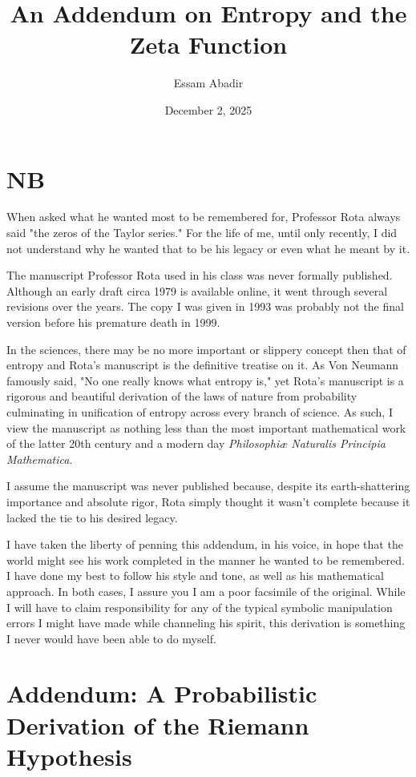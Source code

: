 \documentclass[12pt]{article}
\begin{document}
\title{An Addendum on Entropy and the Zeta Function}
\author{Essam Abadir}
\date{December 2, 2025}
\maketitle

\section*{NB}
When asked what he wanted most to be remembered for, Professor Rota always said "the zeros of the Taylor series." For the life of me, until only recently, I did not understand why he wanted that to be his legacy or even what he meant by it.

The manuscript Professor Rota used in his class was never formally published. Although an early draft circa 1979 is available online, it went through several revisions over the years. The copy I was given in 1993 was probably not the final version before his premature death in 1999. 

In the sciences, there may be no more important or slippery concept then that of entropy and Rota's manuscript is the definitive treatise on it. As Von Neumann famously said, "No one really knows what entropy is," yet Rota's manuscript is a rigorous and beautiful derivation of the laws of nature from probability culminating in unification of entropy across every branch of science. As such, I view the manuscript as nothing less than the most important mathematical work of the latter 20th century and a modern day \textit{Philosophi\ae{} Naturalis Principia Mathematica}.  

I assume the manuscript was never published because, despite its earth-shattering importance and absolute rigor, Rota simply thought it wasn't complete because it lacked the tie to his desired legacy. 

I have taken the liberty of penning this addendum, in his voice, in hope that the world might see his work completed in the manner he wanted to be remembered. I have done my best to follow his style and tone, as well as his mathematical approach. In both cases, I assure you I am a poor facsimile of the original. While I will have to claim responsibility for any of the typical symbolic manipulation errors I might have made while channeling his spirit, this derivation is something I never would have been able to do myself. 

\newpage

\section*{Addendum: A Probabilistic Derivation of the Riemann Hypothesis}
\end{document}
